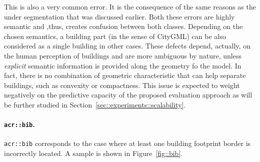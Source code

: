                 This is also a very common error.
                It is the consequence of the same reasons as the under segmentation that was discussed earlier.
                Both these errors are highly semantic and ,thus, creates confusion between both classes.
                Depending on the chosen semantics, a building part (in the sense of CityGML) can be also considered as a single building in other cases.
                These defects depend, actually, on the human perception of buildings and are more ambiguous by nature, unless \textit{explicit} semantic information is provided along the geometry fo the model.
                In fact, there is no combination of geometric characteristic that can help separate buildings, such as convexity or compactness.
                This issue is expected to weight negatively on the predictive capacity of the proposed evaluation approach as will be further studied in Section~\ref{sec::experiments::scalability}.

            \paragraph{\texttt{\acrlong*{acr::bib}}.}
                \texttt{\gls{acr::bib}} corresponds to the case where at least one building footprint border is incorrectly located.
                A sample is shown in Figure~\ref{fig::bib}.\\

